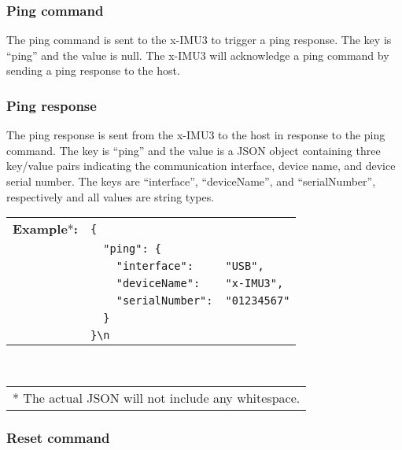 
\subsubsection{Ping command}

The ping command is sent to the x-IMU3 to trigger a ping response.  The key is \enquote{ping} and the value is null.  The x-IMU3 will acknowledge a ping command by sending a ping response to the host.


\subsubsection{Ping response}

The ping response is sent from the x-IMU3 to the host in response to the ping command.  The key is \enquote{ping} and the value is a \ac{JSON} object containing three key/value pairs indicating the communication interface, device name, and device serial number.  The keys are \enquote{interface}, \enquote{deviceName}, and \enquote{serialNumber}, respectively and all values are string types.

\begin{table}[H]
    \begin{tabular}{l l l}
        \textbf{Example}*\textbf{:} & \texttt{\{}\\
        & \texttt{~~"ping":~\{} &\\
        & \texttt{~~~~"interface":} & \texttt{"USB",}\\
        & \texttt{~~~~"deviceName":} & \texttt{"x-IMU3",}\\
        & \texttt{~~~~"serialNumber":} & \texttt{"01234567"}\\
        & \texttt{~~\}}\\
        & \texttt{\}\textbackslash n}\\
    \end{tabular}\\
    \begin{tabular}{l}
        \\
        \footnotesize{* The actual \acs{JSON} will not include any whitespace.}
    \end{tabular}
\end{table}

\subsubsection{Reset command}

